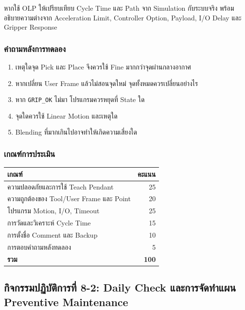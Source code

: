 หากใช้ OLP ให้เปรียบเทียบ Cycle Time และ Path จาก Simulation กับระบบจริง พร้อมอธิบายความต่างจาก Acceleration Limit, Controller Option, Payload, I/O Delay และ Gripper Response

\subsubsection{คำถามหลังการทดลอง}

\begin{enumerate}
    \item เหตุใดจุด Pick และ Place จึงควรใช้ Fine มากกว่าจุดผ่านกลางอากาศ
    \item หากเปลี่ยน User Frame แล้วไม่สอนจุดใหม่ จุดทั้งหมดควรเปลี่ยนอย่างไร
    \item หาก \texttt{GRIP\_OK} ไม่มา โปรแกรมควรหยุดที่ State ใด
    \item จุดใดควรใช้ Linear Motion และเหตุใด
    \item Blending ที่มากเกินไปอาจทำให้เกิดความเสี่ยงใด
\end{enumerate}

\subsubsection{เกณฑ์การประเมิน}

\begin{table}[htbp]
    \centering
    \begin{tabular}{l r}
        \hline
        \textbf{เกณฑ์} & \textbf{คะแนน} \\
        \hline
        ความปลอดภัยและการใช้ Teach Pendant & 25 \\
        ความถูกต้องของ Tool/User Frame และ Point & 20 \\
        โปรแกรม Motion, I/O, Timeout & 25 \\
        การวัดและวิเคราะห์ Cycle Time & 15 \\
        การตั้งชื่อ Comment และ Backup & 10 \\
        การตอบคำถามหลังทดลอง & 5 \\
        \textbf{รวม} & \textbf{100} \\
        \hline
    \end{tabular}
\end{table}



\subsection{กิจกรรมปฏิบัติการที่ 8-2: Daily Check และการจัดทำแผน Preventive Maintenance}

